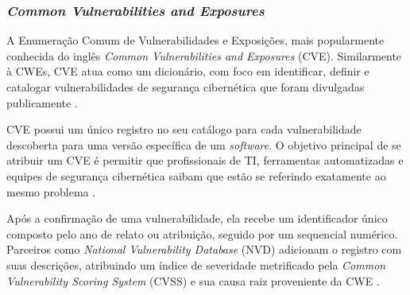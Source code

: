 \documentclass[
    12pt,                %
    openright,           %
    oneside,             %
    a4paper,             %
    english,             %
    brazil               %
]{abntex2}
\begin{document}
\subsubsection[\textit{Common Vulnerabilities and Exposures}]{\textit{Common Vulnerabilities and Exposures}}
\label{sec:cves}
\par
A Enumeração Comum de Vulnerabilidades e Exposições, mais popularmente conhecida do inglês \textit{Common Vulnerabilities and Exposures} (CVE).
Similarmente à CWEs, CVE atua como um dicionário, com foco em identificar, definir e catalogar vulnerabilidades de segurança cibernética que foram divulgadas publicamente \cite{cveabout}.
\par 
CVE possui um único registro no seu catálogo para cada vulnerabilidade descoberta para uma versão específica de um \textit{software}.
O objetivo principal de se atribuir um CVE é permitir que profissionais de TI, ferramentas automatizadas e equipes de segurança cibernética saibam que estão se referindo exatamente ao mesmo problema \cite{cveabout}.
\par
Após a confirmação de uma vulnerabilidade, ela recebe um identificador único composto pelo ano de relato ou atribuição, seguido por um sequencial numérico.
Parceiros como \textit{National Vulnerability Database} (NVD) adicionam o registro com suas descrições, atribuindo um índice de severidade metrificado pela \textit{Common Vulnerability Scoring System} (CVSS) e sua causa raiz proveniente da CWE \cite{cveabout}.
\end{document}
